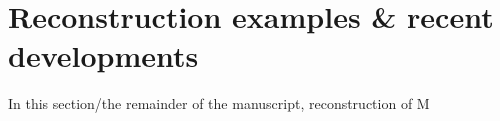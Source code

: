\section{Reconstruction examples & recent developments}

In this section/the remainder of the manuscript, reconstruction of M